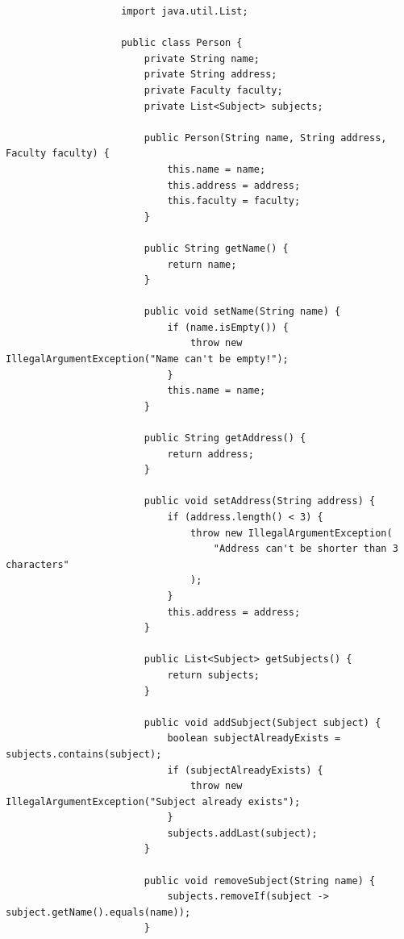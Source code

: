 \documentclass[12pt,titlepage]{article}
\begin{document}
\begin{itemize}
{\begin{itemize}
{\begin{verbatim}
                    import java.util.List;

                    public class Person {
                        private String name;
                        private String address;
                        private Faculty faculty;
                        private List<Subject> subjects;

                        public Person(String name, String address, Faculty faculty) {
                            this.name = name;
                            this.address = address;
                            this.faculty = faculty;
                        }

                        public String getName() {
                            return name;
                        }

                        public void setName(String name) {
                            if (name.isEmpty()) {
                                throw new IllegalArgumentException("Name can't be empty!");
                            }
                            this.name = name;
                        }

                        public String getAddress() {
                            return address;
                        }

                        public void setAddress(String address) {
                            if (address.length() < 3) {
                                throw new IllegalArgumentException(
                                    "Address can't be shorter than 3 characters"
                                );
                            }
                            this.address = address;
                        }

                        public List<Subject> getSubjects() {
                            return subjects;
                        }

                        public void addSubject(Subject subject) {
                            boolean subjectAlreadyExists = subjects.contains(subject);
                            if (subjectAlreadyExists) {
                                throw new IllegalArgumentException("Subject already exists");
                            }
                            subjects.addLast(subject);
                        }

                        public void removeSubject(String name) {
                            subjects.removeIf(subject -> subject.getName().equals(name));
                        }


\end{verbatim}}
\end{itemize}}
\end{itemize}
\end{document}
